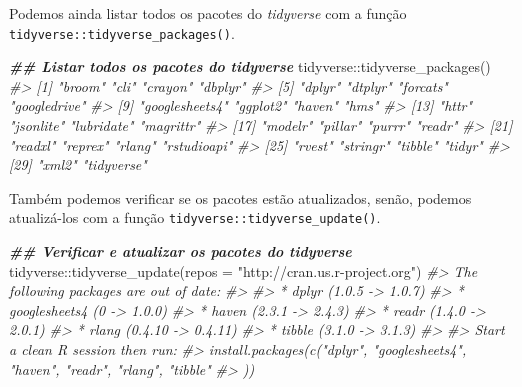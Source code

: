 \documentclass[
]{book}
\newenvironment{Shaded}{\begin{snugshade}}{\end{snugshade}}
\newcommand{\AttributeTok}[1]{\textcolor[rgb]{0.61,0.61,0.61}{#1}}
\newcommand{\CommentTok}[1]{\textcolor[rgb]{0.37,0.37,0.37}{\textit{#1}}}
\newcommand{\DocumentationTok}[1]{\textcolor[rgb]{0.37,0.37,0.37}{\textbf{\textit{#1}}}}
\newcommand{\FunctionTok}[1]{\textcolor[rgb]{0,0,0}{#1}}
\newcommand{\NormalTok}[1]{#1}
\newcommand{\SpecialCharTok}[1]{\textcolor[rgb]{0,0,0}{#1}}
\newcommand{\StringTok}[1]{\textcolor[rgb]{0.5,0.5,0.5}{#1}}
\begin{document}
Podemos ainda listar todos os pacotes do \emph{tidyverse} com a função \texttt{tidyverse::tidyverse\_packages()}.

\begin{Shaded}
\begin{Highlighting}[]
\DocumentationTok{\#\# Listar todos os pacotes do tidyverse }
\NormalTok{tidyverse}\SpecialCharTok{::}\FunctionTok{tidyverse\_packages}\NormalTok{()}
\CommentTok{\#\textgreater{}  [1] "broom"         "cli"           "crayon"        "dbplyr"       }
\CommentTok{\#\textgreater{}  [5] "dplyr"         "dtplyr"        "forcats"       "googledrive"  }
\CommentTok{\#\textgreater{}  [9] "googlesheets4" "ggplot2"       "haven"         "hms"          }
\CommentTok{\#\textgreater{} [13] "httr"          "jsonlite"      "lubridate"     "magrittr"     }
\CommentTok{\#\textgreater{} [17] "modelr"        "pillar"        "purrr"         "readr"        }
\CommentTok{\#\textgreater{} [21] "readxl"        "reprex"        "rlang"         "rstudioapi"   }
\CommentTok{\#\textgreater{} [25] "rvest"         "stringr"       "tibble"        "tidyr"        }
\CommentTok{\#\textgreater{} [29] "xml2"          "tidyverse"}
\end{Highlighting}
\end{Shaded}

Também podemos verificar se os pacotes estão atualizados, senão, podemos atualizá-los com a função \texttt{tidyverse::tidyverse\_update()}.

\begin{Shaded}
\begin{Highlighting}[]
\DocumentationTok{\#\# Verificar e atualizar os pacotes do tidyverse }
\NormalTok{tidyverse}\SpecialCharTok{::}\FunctionTok{tidyverse\_update}\NormalTok{(}\AttributeTok{repos =} \StringTok{"http://cran.us.r{-}project.org"}\NormalTok{)}
\CommentTok{\#\textgreater{} The following packages are out of date:}
\CommentTok{\#\textgreater{} }
\CommentTok{\#\textgreater{} * dplyr         (1.0.5 {-}\textgreater{} 1.0.7)}
\CommentTok{\#\textgreater{} * googlesheets4 (0 {-}\textgreater{} 1.0.0)}
\CommentTok{\#\textgreater{} * haven         (2.3.1 {-}\textgreater{} 2.4.3)}
\CommentTok{\#\textgreater{} * readr         (1.4.0 {-}\textgreater{} 2.0.1)}
\CommentTok{\#\textgreater{} * rlang         (0.4.10 {-}\textgreater{} 0.4.11)}
\CommentTok{\#\textgreater{} * tibble        (3.1.0 {-}\textgreater{} 3.1.3)}
\CommentTok{\#\textgreater{} }
\CommentTok{\#\textgreater{} Start a clean R session then run:}
\CommentTok{\#\textgreater{} install.packages(c("dplyr", "googlesheets4", "haven", "readr", "rlang", "tibble"}
\CommentTok{\#\textgreater{} ))}
\end{Highlighting}
\end{Shaded}
\end{document}
